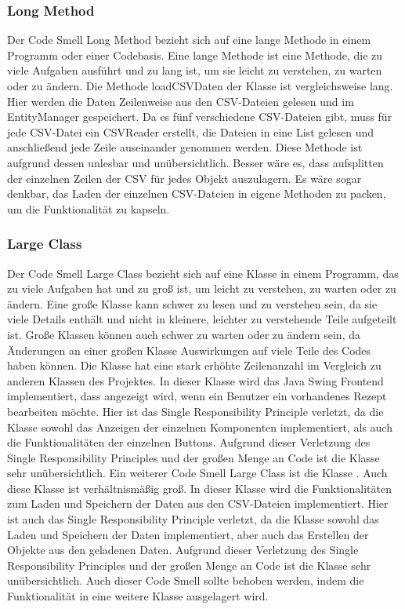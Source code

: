 \subsubsection{Long Method}\label{LM}
Der Code Smell Long Method bezieht sich auf eine lange Methode in einem Programm oder einer Codebasis. Eine lange Methode ist eine Methode, die zu viele Aufgaben ausführt und zu lang ist, um sie leicht zu verstehen, zu warten oder zu ändern. 
Die Methode loadCSVDaten der Klasse \href{https://github.com/MichaelaHaag/RezeptApp/blob/main/1-Adapter/src/main/java/de/rezeptapp/adapter/Datenpersistenz/DataReader.java}{} ist vergleichsweise lang. Hier werden die Daten Zeilenweise aus den CSV-Dateien gelesen und im EntityManager gespeichert.
Da es fünf verschiedene CSV-Dateien gibt, muss für jede CSV-Datei ein CSVReader erstellt, die Dateien in eine List gelesen und anschließend jede Zeile auseinander genommen werden. Diese Methode ist aufgrund dessen unlesbar und unübersichtlich. Besser wäre es, dass aufsplitten der einzelnen Zeilen der CSV für jedes Objekt auszulagern. Es wäre sogar denkbar, das Laden der einzelnen CSV-Dateien in eigene Methoden zu packen, um die Funktionalität zu kapseln.
\subsubsection{Large Class}
Der Code Smell Large Class bezieht sich auf eine Klasse in einem Programm, das zu viele Aufgaben hat und zu groß ist, um leicht zu verstehen, zu warten oder zu ändern. Eine große Klasse kann schwer zu lesen und zu verstehen sein, da sie viele Details enthält und nicht in kleinere, leichter zu verstehende Teile aufgeteilt ist. Große Klassen können auch schwer zu warten oder zu ändern sein, da Änderungen an einer großen Klasse Auswirkungen auf viele Teile des Codes haben können. Die Klasse \href{https://github.com/MichaelaHaag/RezeptApp/blob/main/0-Plugins/src/main/java/de/rezeptapp/plugins/gui/RezeptBearbeiten.java}{} hat eine stark erhöhte Zeilenanzahl im Vergleich zu anderen Klassen des Projektes. In dieser Klasse wird das Java Swing Frontend implementiert, dass angezeigt wird, wenn ein Benutzer ein vorhandenes Rezept bearbeiten möchte. Hier ist das Single Responsibility Principle verletzt, da die Klasse sowohl das Anzeigen der einzelnen Komponenten implementiert, als auch die Funktionalitäten der einzelnen Buttons. Aufgrund dieser Verletzung des Single Responsibility Principles und der großen Menge an Code ist die Klasse sehr unübersichtlich. Ein weiterer Code Smell Large Class ist die Klasse \href{https://github.com/MichaelaHaag/RezeptApp/blob/main/1-Adapter/src/main/java/de/rezeptapp/adapter/Datenpersistenz/DataReader.java}{}. Auch diese Klasse ist verhältnismäßig groß. In dieser Klasse wird die Funktionalitäten zum Laden und Speichern der Daten aus den CSV-Dateien implementiert. Hier ist auch das Single Responsibility Principle verletzt, da die Klasse sowohl das Laden und Speichern der Daten implementiert, aber auch das Erstellen der Objekte aus den geladenen Daten. Aufgrund dieser Verletzung des Single Responsibility Principles und der großen Menge an Code ist die Klasse sehr unübersichtlich. Auch dieser Code Smell sollte behoben werden, indem die Funktionalität in eine weitere Klasse ausgelagert wird.
